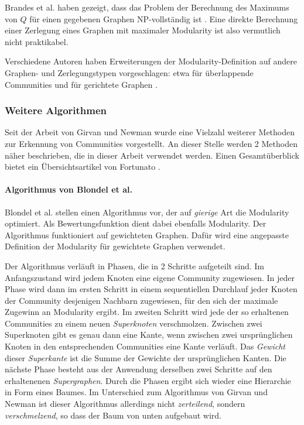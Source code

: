 Brandes et al. haben gezeigt, dass das Problem der Berechnung des
Maximums von $Q$ für einen gegebenen Graphen NP-vollständig
ist \cite{DBLP:journals/tkde/BrandesDGGHNW08}. Eine direkte Berechnung
einer Zerlegung eines Graphen mit maximaler Modularity ist also
vermutlich nicht praktikabel.

Verschiedene Autoren haben Erweiterungen der Modularity-Definition auf
andere Graphen- und Zerlegungstypen vorgeschlagen: etwa für
überlappende Communities \cite{Nicosia2009} und für gerichtete
Graphen \cite{Leicht2008}.

\subsubsection{Weitere Algorithmen}
\label{sec:algorithmen}

Seit der Arbeit von Girvan und Newman wurde eine Vielzahl weiterer
Methoden zur Erkennung von Communities vorgestellt. An dieser Stelle
werden 2 Methoden näher beschrieben, die in dieser Arbeit verwendet
werden. Einen Gesamtüberblick bietet ein Übersichtsartikel von
Fortunato \cite{Fortunato2010}.

\paragraph{Algorithmus von Blondel et al.}
\label{sec:algor-von-blond}

Blondel et al.\cite{Blondel2008} stellen einen Algorithmus vor, der
auf \emph{gierige} Art die Modularity optimiert.  Als
Bewertungsfunktion dient dabei ebenfalls Modularity. Der Algorithmus
funktioniert auf gewichteten Graphen. Dafür wird eine angepasste
Definition der Modularity für gewichtete Graphen
verwendet\cite{Newman2004a}.

Der Algorithmus verläuft in Phasen, die in 2 Schritte aufgeteilt
sind. Im Anfangszustand wird jedem Knoten eine eigene Community
zugewiesen. In jeder Phase wird dann im ersten Schritt in einem
sequentiellen Durchlauf jeder Knoten der Community desjenigen
Nachbarn zugewiesen, für den sich der maximale Zugewinn an
Modularity ergibt. Im zweiten Schritt wird jede der so erhaltenen
Communities zu einem neuen \emph{Superknoten} verschmolzen. Zwischen
zwei Superknoten gibt es genau dann eine Kante, wenn zwischen zwei
ursprünglichen Knoten in den entsprechenden Communities eine Kante
verläuft. Das \emph{Gewicht} dieser \emph{Superkante} ist die Summe
der Gewichte der ursprünglichen Kanten. Die nächste Phase besteht
aus der Anwendung derselben zwei Schritte auf den erhaltenenen
\emph{Supergraphen}. Durch die Phasen ergibt sich wieder eine
Hierarchie in Form eines Baumes. Im Unterschied zum Algorithmus von
Girvan und Newman ist dieser Algorithmus allerdings nicht
\emph{zerteilend}, sondern \emph{verschmelzend}, so dass der Baum von
unten aufgebaut wird.

